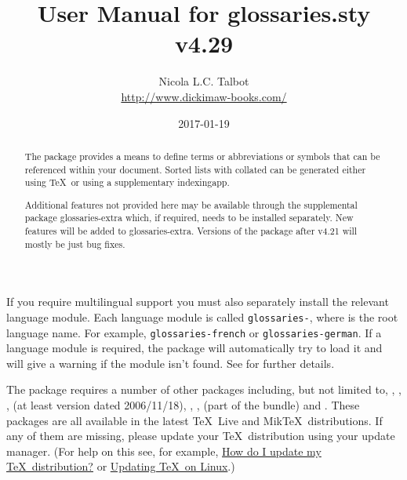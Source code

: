 \documentclass[report,inlinetitle,widecs]{nlctdoc}
\begin{document}
\DeleteShortVerb{\|}

 \title{User Manual for glossaries.sty v4.29}
 \author{Nicola L.C. Talbot\\%
  \url{http://www.dickimaw-books.com/}}

 \date{2017-01-19}
 \maketitle

\begin{abstract}
The  package provides a means to define terms or
abbreviations or symbols that can be referenced within your document.
Sorted lists with collated  can be 
generated either using \TeX\ or using a supplementary \gls{indexingapp}.

Additional features not provided here may be available through
the supplemental package \gls{glossaries-extra} which, if required,
needs to be installed separately. New features will be added to
\gls*{glossaries-extra}. Versions of the 
package after v4.21 will mostly be just bug fixes.
\end{abstract}

If you require multilingual support you must also separately install 
the relevant language module. Each language module is called
\texttt{glossaries-}, where  is the
root language name. For example, \texttt{glossaries-french}
or \texttt{glossaries-german}. If a language module is required,
the  package will automatically try to load it and
will give a warning if the module isn't found. See
 for further details.

The  package requires a number of other packages
including, but not limited to, , ,
,
 (at least version dated 2006/11/18), ,
,  (part of the  bundle) and . These
packages are all available in the latest \TeX~Live and Mik\TeX\
distributions. If any of them are missing, please update your
\TeX\ distribution using your update manager.
(For help on this see, for example,
\href{http://tex.stackexchange.com/questions/55437/how-do-i-update-my-tex-distribution}{How
do I update my \TeX\ distribution?}
or
\href{http://tex.stackexchange.com/questions/14925/updating-tex-on-linux}{Updating
\TeX\ on Linux}.)
\end{document}
